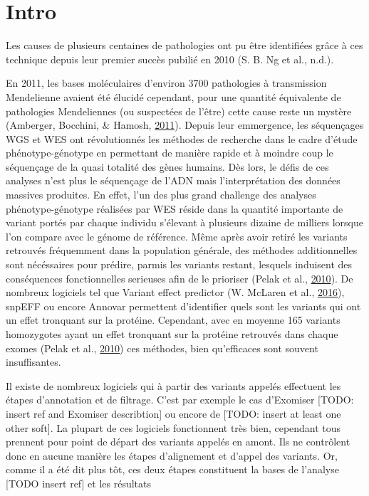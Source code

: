 \documentclass[12pt,twoside]{reedthesis}
\theoremstyle{definition}
\theoremstyle{definition}
\theoremstyle{remark}
\begin{document}
  \section{Intro}\label{intro}
  
  Les causes de plusieurs centaines de pathologies ont pu être identifiées
  grâce à ces technique depuis leur premier succès pubilié en 2010 (S. B.
  Ng et al., n.d.).
  
  En 2011, les bases moléculaires d'environ 3700 pathologies à
  transmission Mendelienne avaient été élucidé cependant, pour une
  quantité équivalente de pathologies Mendeliennes (ou suspectées de
  l'être) cette cause reste un mystère (Amberger, Bocchini, \& Hamosh,
  \protect\hyperlink{ref-Amberger2011}{2011}). Depuis leur emmergence, les
  séquençages WGS et WES ont révolutionnés les méthodes de recherche dans
  le cadre d'étude phénotype-génotype en permettant de manière rapide et à
  moindre coup le séquençage de la quasi totalité des gènes humains. Dès
  lors, le défis de ces analyses n'est plus le séquençage de l'ADN mais
  l'interprétation des données massives produites. En effet, l'un des plus
  grand challenge des analyses phénotype-génotype réalisées par WES réside
  dans la quantité importante de variant portés par chaque individu
  s'élevant à plusieurs dizaine de milliers lorsque l'on compare avec le
  génome de référence. Même après avoir retiré les variants retrouvés
  fréquemment dans la population générale, des méthodes additionnelles
  sont nécéssaires pour prédire, parmis les variants restant, lesquels
  induisent des conséquences fonctionnelles serieuses afin de le prioriser
  (Pelak et al., \protect\hyperlink{ref-Pelak2010}{2010}). De nombreux
  logiciels tel que Variant effect predictor (W. McLaren et al.,
  \protect\hyperlink{ref-McLaren2016}{2016}), snpEFF ou encore Annovar
  permettent d'identifier quels sont les variants qui ont un effet
  tronquant sur la protéine. Cependant, avec en moyenne 165 variants
  homozygotes ayant un effet tronquant sur la protéine retrouvés dans
  chaque exomes (Pelak et al., \protect\hyperlink{ref-Pelak2010}{2010})
  ces méthodes, bien qu'efficaces sont souvent insuffisantes.
  
  Il existe de nombreux logiciels qui à partir des variants appelés
  effectuent les étapes d'annotation et de filtrage. C'est par exemple le
  cas d'Exomiser {[}TODO: insert ref and Exomiser describtion{]} ou encore
  de {[}TODO: insert at least one other soft{]}. La plupart de ces
  logiciels fonctionnent très bien, cependant tous prennent pour point de
  départ des variants appelés en amont. Ils ne contrôlent donc en aucune
  manière les étapes d'alignement et d'appel des variants. Or, comme il a
  été dit plus tôt, ces deux étapes constituent la bases de l'analyse
  {[}TODO insert ref{]} et les résultats
  
\end{document}
